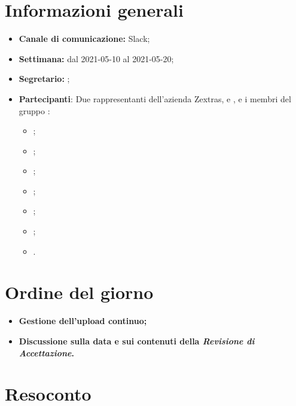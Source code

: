 \section{Informazioni generali}

\begin{itemize}

    \item \textbf{Canale di comunicazione:} Slack;

    \item \textbf{Settimana:} dal 2021-05-10 al 2021-05-20;

    \item \textbf{Segretario:} \ACapoRedazione{};

    \item \textbf{Partecipanti}: Due rappresentanti dell'azienda Zextras, \textit{\Alessio{}} e \textit{\Federico{}}, e i membri del gruppo \Gruppo{}:
        \begin{itemize}
            \item \Daniele{};
            \item \Davide{};
            \item \Francesco{};
            \item \Tommaso{};
            \item \Lucrezia{};
            \item \Matteo{};
            \item \Giosue{}.
        \end{itemize}
\end{itemize}

\section{Ordine del giorno}

\begin{itemize}
    \item\textbf{Gestione dell'upload continuo;}
    \item\textbf{Discussione sulla data e sui contenuti della \textit{Revisione di Accettazione}.}
\end{itemize}
\newpage


\section{Resoconto}
